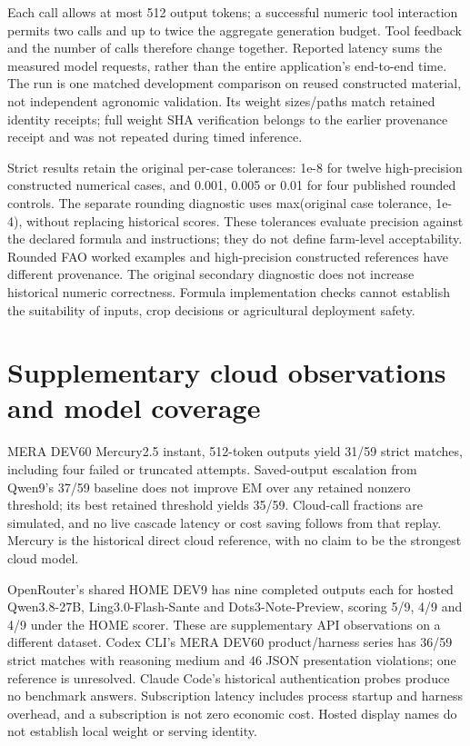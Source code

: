 \documentclass[10pt,a4paper]{article}
\begin{document}
Each call allows at most 512 output tokens; a successful numeric tool interaction permits two calls and up to twice the aggregate generation budget. Tool feedback and the number of calls therefore change together. Reported latency sums the measured model requests, rather than the entire application's end-to-end time. The run is one matched development comparison on reused constructed material, not independent agronomic validation. Its weight sizes/paths match retained identity receipts; full weight SHA verification belongs to the earlier provenance receipt and was not repeated during timed inference.


Strict results retain the original per-case tolerances: 1e-8 for twelve high-precision constructed numerical cases, and 0.001, 0.005 or 0.01 for four published rounded controls. The separate rounding diagnostic uses max(original case tolerance, 1e-4), without replacing historical scores. These tolerances evaluate precision against the declared formula and instructions; they do not define farm-level acceptability. Rounded FAO worked examples and high-precision constructed references have different provenance. The original secondary diagnostic does not increase historical numeric correctness. Formula implementation checks cannot establish the suitability of inputs, crop decisions or agricultural deployment safety.


\section{Supplementary cloud observations and model coverage}

MERA DEV60 Mercury2.5 instant, 512-token outputs yield 31/59 strict matches, including four failed or truncated attempts. Saved-output escalation from Qwen9's 37/59 baseline does not improve EM over any retained nonzero threshold; its best retained threshold yields 35/59. Cloud-call fractions are simulated, and no live cascade latency or cost saving follows from that replay. Mercury is the historical direct cloud reference, with no claim to be the strongest cloud model.


OpenRouter's shared HOME DEV9 has nine completed outputs each for hosted Qwen3.8-27B, Ling3.0-Flash-Sante and Dots3-Note-Preview, scoring 5/9, 4/9 and 4/9 under the HOME scorer. These are supplementary API observations on a different dataset. Codex CLI's MERA DEV60 product/harness series has 36/59 strict matches with reasoning medium and 46 JSON presentation violations; one reference is unresolved. Claude Code's historical authentication probes produce no benchmark answers. Subscription latency includes process startup and harness overhead, and a subscription is not zero economic cost. Hosted display names do not establish local weight or serving identity.
\end{document}
